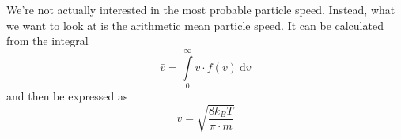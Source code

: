     We're not actually interested in the most probable particle speed.
    Instead, what we want to look at is the arithmetic mean particle speed.
    It can be calculated from the integral 
    \begin{equation}
        \bar{v}
        =\int\limits_0^\infty v\cdot f(v)\ \text{d}v
    \end{equation}
    and then be expressed as
    \begin{equation}
        \bar{v}
        =\sqrt{\frac{8k_BT}{\pi\cdot m}}
    \end{equation}
